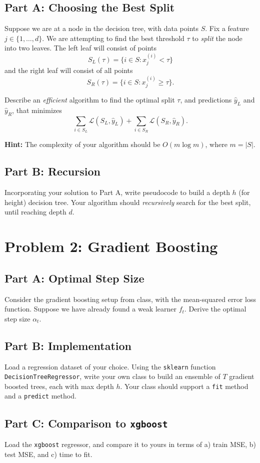 \documentclass{article}
\begin{document}
\subsection*{Part A: Choosing the Best Split}

Suppose we are at a node in the decision tree, with data points $S$.
Fix a feature $j \in \{1, \ldots, d\}$.
We are attempting to find the best threshold $\tau$ to \textit{split} the node into two leaves.
The left leaf will consist of points
$$
S_L(\tau) = \{i \in S: x_j^{(i)} < \tau\}
$$
and the right leaf will consist of all points 
$$
S_R(\tau) = \{i \in S: x_j^{(i)} \geq \tau\}.
$$

Describe an \textit{efficient} algorithm to find the optimal split $\tau$, and predictions $\hat{y}_L$ and $\hat{y}_R$, that minimizes
$$
\sum_{i \in S_L} \mathcal{L}(S_L, \hat{y}_L)
+ \sum_{i \in S_R} \mathcal{L}(S_R, \hat{y}_R).
$$

\textbf{Hint:} The complexity of your algorithm should be $O(m \log m)$, where $m=|S|$.

\subsection*{Part B: Recursion}

Incorporating your solution to Part A, write pseudocode to build a depth $h$ (for height) decision tree. Your algorithm should \textit{recursively} search for the best split, until reaching depth $d$.

%

\newpage
\section*{Problem 2: Gradient Boosting}

\subsection*{Part A: Optimal Step Size}

Consider the gradient boosting setup from class, with the mean-squared error loss function.
Suppose we have already found a weak learner $f_t$.
Derive the optimal step size $\alpha_t$.

\subsection*{Part B: Implementation}

Load a regression dataset of your choice.
Using the \texttt{sklearn} function \texttt{DecisionTreeRegressor}, write your own class to build an ensemble of $T$ gradient boosted trees, each with max depth $h$.
Your class should support a \texttt{fit} method and a \texttt{predict} method.

\subsection*{Part C: Comparison to \texttt{xgboost}}

Load the \texttt{xgboost} regressor, and compare it to yours in terms of a) train MSE, b) test MSE, and c) time to fit.

%
\end{document}
